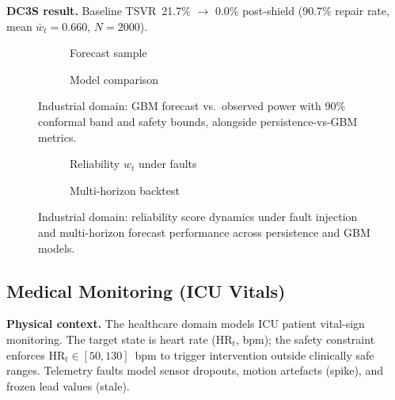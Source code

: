 \textbf{DC3S result.}
Baseline TSVR~21.7\% $\rightarrow$ 0.0\% post-shield (90.7\% repair rate,
mean $\bar{w}_t = 0.660$, $N = 2000$).

\begin{figure}[htbp]
  \centering
  \begin{subfigure}[b]{0.48\linewidth}
    \caption{Forecast sample}
  \end{subfigure}
  \hfill
  \begin{subfigure}[b]{0.48\linewidth}
    \caption{Model comparison}
  \end{subfigure}
  \caption{Industrial domain: GBM forecast vs.\ observed power with 90\%
    conformal band and safety bounds, alongside persistence-vs-GBM metrics.}
  \label{fig:industrial-profile}
\end{figure}

\begin{figure}[htbp]
  \centering
  \begin{subfigure}[b]{0.48\linewidth}
    \caption{Reliability $w_t$ under faults}
  \end{subfigure}
  \hfill
  \begin{subfigure}[b]{0.48\linewidth}
    \caption{Multi-horizon backtest}
  \end{subfigure}
  \caption{Industrial domain: reliability score dynamics under fault injection
    and multi-horizon forecast performance across persistence and GBM models.}
  \label{fig:industrial-profile-2}
\end{figure}

\subsection{Medical Monitoring (ICU Vitals)}
\label{sec:profile-healthcare}

\textbf{Physical context.}
The healthcare domain models ICU patient vital-sign monitoring.  The
target state is heart rate ($\text{HR}_t$, bpm); the safety constraint
enforces $\text{HR}_t \in [50, 130]$~bpm to trigger intervention outside
clinically safe ranges.  Telemetry faults model sensor dropouts, motion
artefacts (spike), and frozen lead values (stale).

